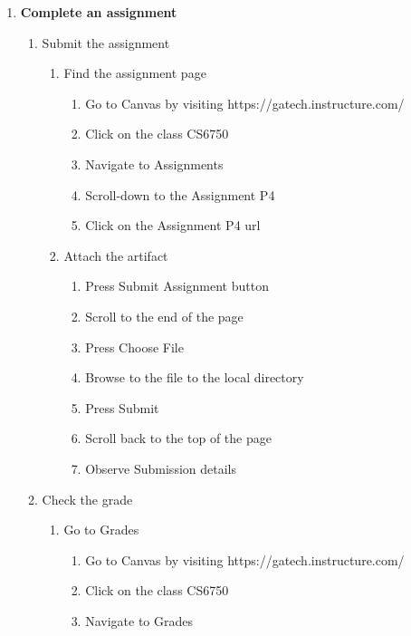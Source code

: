 \documentclass[12pt,letterpaper]{article}
\begin{document}
\begin{enumerate}
    \item \textbf{Complete an assignment}
    \begin{enumerate}
        \item Submit the assignment
            \begin{enumerate}
                \item Find the assignment page 
                \begin{enumerate}
                    \item Go to Canvas by visiting https://gatech.instructure.com/
                    \item Click on the class CS6750
                    \item Navigate to Assignments
                    \item Scroll-down to the Assignment P4
                    \item Click on the Assignment P4 url
                \end{enumerate}
                \item Attach the artifact
                \begin{enumerate}
                    \item Press Submit Assignment button
                    \item Scroll to the end of the page
                    \item Press Choose File
                    \item Browse to the file to the local directory
                    \item Press Submit
                    \item Scroll back to the top of the page
                    \item Observe Submission details
                \end{enumerate}
            \end{enumerate}
        \item Check the grade
            \begin{enumerate}
                \item Go to Grades
                \begin{enumerate}
                    \item Go to Canvas by visiting https://gatech.instructure.com/
                    \item Click on the class CS6750
                    \item Navigate to Grades

\end{enumerate}
\end{enumerate}
\end{enumerate}
\end{enumerate}
\end{document}
